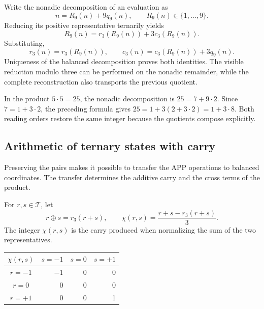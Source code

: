 Write the nonadic decomposition of an evaluation as
\[
 n=R_9(n)+9q_9(n),\qquad R_9(n)\in\{1,\ldots,9\}.
\]
Reducing its positive representative ternarily yields
\[
 R_9(n)=r_3(R_9(n))+3c_3(R_9(n)).
\]
Substituting,
\begin{equation}
 r_3(n)=r_3(R_9(n)),\qquad
 c_3(n)=c_3(R_9(n))+3q_9(n).
\label{trit:eq:compatibilidad39}
\end{equation}
Uniqueness of the balanced decomposition proves both identities.
The visible reduction modulo three can be performed on the nonadic
remainder, while the complete reconstruction also transports the
previous quotient.

In the product \(5\cdot5=25\), the nonadic decomposition is
\(25=7+9\cdot2\). Since \(7=1+3\cdot2\), the preceding formula gives
\(25=1+3(2+3\cdot2)=1+3\cdot8\). Both reading orders restore
the same integer because the quotients compose explicitly.

\subsection{Arithmetic of ternary states with carry}
\label{trit:aritmetica}

Preserving the pairs makes it possible to transfer the APP operations to
balanced coordinates. The transfer determines the additive carry and
the cross terms of the product.

\begin{definicion}
For \(r,s\in\mathcal T\), let
\[
 r\oplus s=r_3(r+s),\qquad
 \chi(r,s)=\frac{r+s-r_3(r+s)}3.
\]
The integer \(\chi(r,s)\) is the carry produced when normalizing the sum of
the two representatives.
\end{definicion}

\begin{tablacompleta}
\caption{Additive carry of the balanced ternary section.}
\begin{tabular}{c|rrr}
\toprule
\(\chi(r,s)\)&\(s=-1\)&\(s=0\)&\(s=+1\)\\
\midrule
\(r=-1\)&$-1$&0&0\\
\(r=0\)&0&0&0\\
\(r=+1\)&0&0&1\\
\bottomrule
\end{tabular}
\end{tablacompleta}

